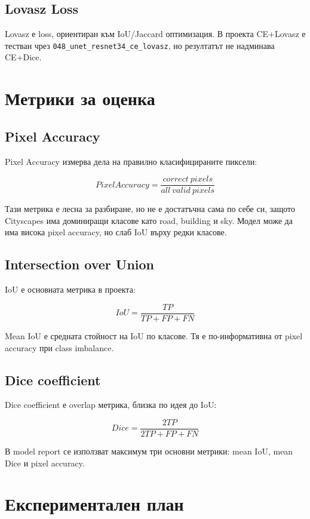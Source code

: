 \documentclass[12pt,a4paper]{article}
\newcommand{\code}[1]{\texttt{#1}}
\begin{document}
\subsection{Lovasz Loss}

Lovasz е loss, ориентиран към IoU/Jaccard оптимизация. В проекта CE+Lovasz е тестван чрез \code{048\_unet\_resnet34\_ce\_lovasz}, но резултатът не надминава CE+Dice.

\section{Метрики за оценка}

\subsection{Pixel Accuracy}

Pixel Accuracy измерва дела на правилно класифицираните пиксели:

\[
PixelAccuracy = \frac{correct\ pixels}{all\ valid\ pixels}
\]

Тази метрика е лесна за разбиране, но не е достатъчна сама по себе си, защото Cityscapes има доминиращи класове като road, building и sky. Модел може да има висока pixel accuracy, но слаб IoU върху редки класове.

\subsection{Intersection over Union}

IoU е основната метрика в проекта:

\[
IoU = \frac{TP}{TP + FP + FN}
\]

Mean IoU е средната стойност на IoU по класове. Тя е по-информативна от pixel accuracy при class imbalance.

\subsection{Dice coefficient}

Dice coefficient е overlap метрика, близка по идея до IoU:

\[
Dice = \frac{2TP}{2TP + FP + FN}
\]

В model report се използват максимум три основни метрики: mean IoU, mean Dice и pixel accuracy.

\section{Експериментален план}
\end{document}
